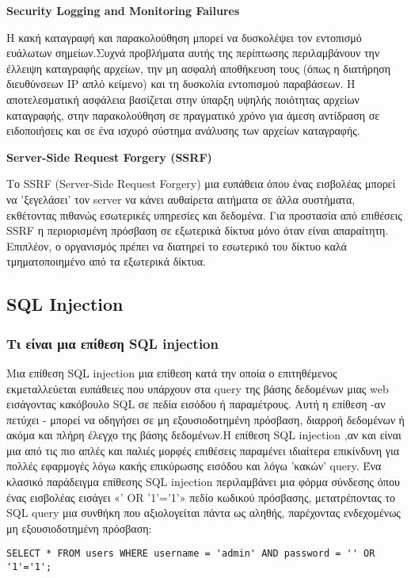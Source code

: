 \begin{center}
    \textbf{\lt Security Logging and Monitoring Failures}
\end{center}

Η κακή καταγραφή και παρακολούθηση μπορεί να δυσκολέψει τον εντοπισμό ευάλωτων σημείων.Συχνά προβλήματα αυτής της περίπτωσης περιλαμβάνουν την έλλειψη καταγραφής αρχείων, την μη ασφαλή αποθήκευση τους (όπως η διατήρηση διευθύνσεων \lt IP  απλό κείμενο) και τη δυσκολία εντοπισμού παραβάσεων. Η αποτελεσματική ασφάλεια βασίζεται στην ύπαρξη υψηλής ποιότητας αρχείων καταγραφής, στην παρακολούθηση σε πραγματικό χρόνο για άμεση αντίδραση σε ειδοποιήσεις και σε ένα ισχυρό σύστημα ανάλυσης των αρχείων καταγραφής.

\begin{center}
    \textbf{\lt Server-Side Request Forgery (SSRF)}
\end{center}

Το \lt SSRF (Server-Side Request Forgery)  μια ευπάθεια όπου ένας εισβολέας μπορεί να 'ξεγελάσει' τον \lt server  να κάνει αυθαίρετα αιτήματα σε άλλα συστήματα, εκθέτοντας πιθανώς εσωτερικές υπηρεσίες και δεδομένα. Για προστασία από επιθέσεις \lt SSRF  η περιορισμένη πρόσβαση σε εξωτερικά δίκτυα μόνο όταν είναι απαραίτητη. Επιπλέον, ο οργανισμός πρέπει να διατηρεί το εσωτερικό του δίκτυο καλά τμηματοποιημένο από τα εξωτερικά δίκτυα.

\subsection{\lt SQL Injection}
\subsubsection{Τι είναι μια επίθεση \lt SQL injection}

\hspace*{2em}Μια επίθεση \lt SQL injection  μια επίθεση κατά την οποία  ο επιτηθέμενος εκμεταλλεύεται ευπάθειες που υπάρχουν στα \lt query \gt της βάσης δεδομένων μιας \lt web  εισάγοντας κακόβουλο \lt SQL  σε πεδία εισόδου ή παραμέτρους. Αυτή η επίθεση -αν πετύχει - μπορεί να οδηγήσει σε μη εξουσιοδοτημένη πρόσβαση, διαρροή δεδομένων ή ακόμα και πλήρη έλεγχο της βάσης δεδομένων.Η επίθεση \lt SQL injection \gt ,αν και είναι μια από τις πιο απλές και παλιές μορφές επιθέσεις παραμένει ιδιαίτερα επικίνδυνη για πολλές εφαρμογές λόγω κακής επικύρωσης εισόδου και λόγω 'κακών' \lt query\gt. Ένα κλασικό παράδειγμα επίθεσης \lt SQL injection \gt περιλαμβάνει μια φόρμα σύνδεσης όπου ένας εισβολέας εισάγει \lt «' OR '1'='1'»  πεδίο κωδικού πρόσβασης, μετατρέποντας το \lt SQL query  μια συνθήκη που αξιολογείται πάντα ως αληθής, παρέχοντας ενδεχομένως μη εξουσιοδοτημένη πρόσβαση:
\lt
\begin{lstlisting}
SELECT * FROM users WHERE username = 'admin' AND password = '' OR '1'='1';
\end{lstlisting}



